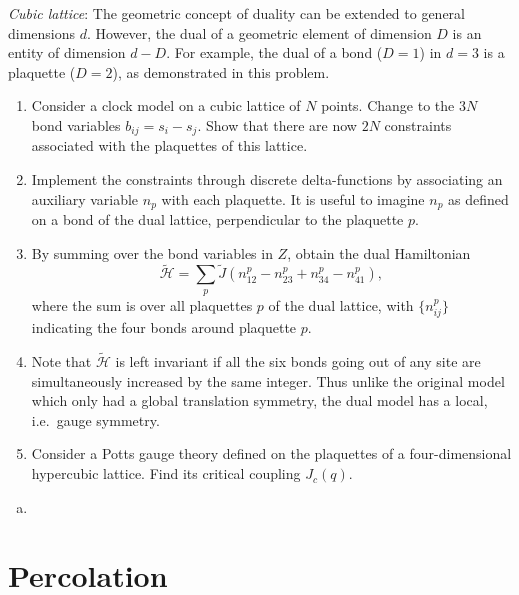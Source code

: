 \begin{problem}
    \textit{Cubic lattice}: The geometric concept of duality can be extended to general dimensions $d$. However, the dual of a geometric element of dimension $D$ is an entity of dimension $d - D$. For example, the dual of a bond ($D = 1$) in $d = 3$ is a plaquette ($D = 2$), as demonstrated in this problem.

    \begin{enumerate}
        \item[(a)] Consider a clock model on a cubic lattice of $N$ points. Change to the $3N$ bond variables $b_{ij} = s_i - s_j$. Show that there are now $2N$ constraints associated with the plaquettes of this lattice.

        \item[(b)] Implement the constraints through discrete delta-functions by associating an auxiliary variable $n_p$ with each plaquette. It is useful to imagine $n_p$ as defined on a bond of the dual lattice, perpendicular to the plaquette $p$.

        \item[(c)] By summing over the bond variables in $Z$, obtain the dual Hamiltonian
        \[
            \tilde{\mathcal{H}} = \sum_p \tilde{J}\!\left(n_{12}^p - n_{23}^p + n_{34}^p - n_{41}^p\right),
        \]
        where the sum is over all plaquettes $p$ of the dual lattice, with $\{n_{ij}^p\}$ indicating the four bonds around plaquette $p$.

        \item[(d)] Note that $\tilde{\mathcal{H}}$ is left invariant if all the six bonds going out of any site are simultaneously increased by the same integer. Thus unlike the original model which only had a global translation symmetry, the dual model has a local, i.e.\ gauge symmetry.

        \item[(e)] Consider a Potts gauge theory defined on the plaquettes of a four-dimensional hypercubic lattice. Find its critical coupling $J_c(q)$.
    \end{enumerate}
\end{problem}

\begin{solution}
    \begin{enumerate}[(a)]
        \item
    \end{enumerate}
\end{solution}

\section*{Percolation}

